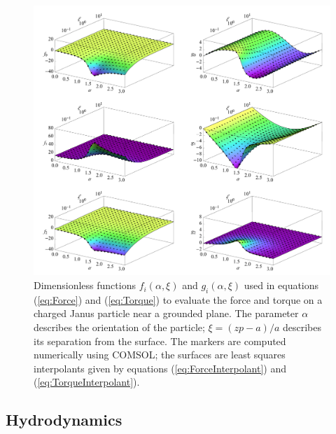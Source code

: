 \begin{appendices}
\begin{figure}
    \centering
    \includegraphics[width=15cm]{figures/A1_ForceTorque.png}
    \caption{Dimensionless functions $f_i(\alpha,\xi)$ and $g_i(\alpha,\xi)$ used in equations (\ref{eq:Force}) and (\ref{eq:Torque}) to evaluate the force and torque on a charged Janus particle near a grounded plane. The parameter $\alpha$ describes the orientation of the particle; $\xi=(zp-a)/a$ describes its separation from the surface. The markers are computed numerically using COMSOL; the surfaces are least squares interpolants given by equations (\ref{eq:ForceInterpolant}) and (\ref{eq:TorqueInterpolant}).}
    \label{fig:ForceTorque}
\end{figure}


\subsection{Hydrodynamics}


\end{appendices}

